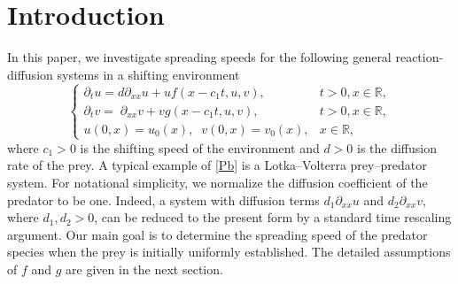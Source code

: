 \documentclass[10pt]{article}
\numberwithin{equation}{section}
\newcommand{\R}{\mathbb{R}}
\begin{document}
\begin{abstract}
This note  is concerned with  the spreading speed of the predator component in  a  class  of prey--predator   reaction--diffusion systems  with  spatiotemporal heterogeneity  depending on  a moving variable.  The main difficulty is that the full system lacks  a direct comparison principle. 
We establish a pointwise estimate showing that the prey density is close to its carrying capacity   wherever the predator  density is sufficiently small.  This allows us to compare solutions of  the system with  those of  scalar  Fisher--KPP equations in shifting environments.  Consequently, we obtain an   explicit formula for the  spreading speed of the predator.   In particular, for nonmonotone shifting environments, locking and nonlocal pulling phenomena may occur.    




\vspace{0.1in}
\noindent \textbf{Key words}.  spreading speeds; shifting environments; prey-predator systems 


	\vspace{0.1in}\noindent \textbf{2020 Mathematical Subject Classification}. 35K45, 35K57, 92D25
\end{abstract}











\section{Introduction}
In this paper, we investigate   spreading speeds for the following general reaction-diffusion systems  in a shifting environment
\begin{equation}\label{Pb}
\begin{cases}
\partial_t u= d \partial_{xx} u  +  u f(x-c_1t, u,v),  & t>0, x\in \R,\\
\partial_t v= \; \partial_{xx} v + vg( x-c_1 t,  u,  v ),  & t>0, x\in \R, \\
u(0, x)=u_0(x), \;\; v(0, x)= v_0(x), & x\in \R,
\end{cases}
\end{equation}
where $c_1>0$ is the shifting speed of  the  environment and $d>0$ is the diffusion rate of the prey.   
A typical example  of \eqref{Pb}   is a Lotka--Volterra  prey--predator system.    
For notational simplicity, we normalize the diffusion coefficient of the predator to be one. Indeed, a system with diffusion terms $d_1\partial_{xx} u$ and $d_2 \partial_{xx}v$, where $d_1,d_2>0$, can be reduced to the present form by a standard  time rescaling argument.
Our main goal is to determine the spreading speed of the predator species when the prey  is initially uniformly established.  The detailed assumptions  of $f$ and $g$ are given in the  next section. 
\end{document}
